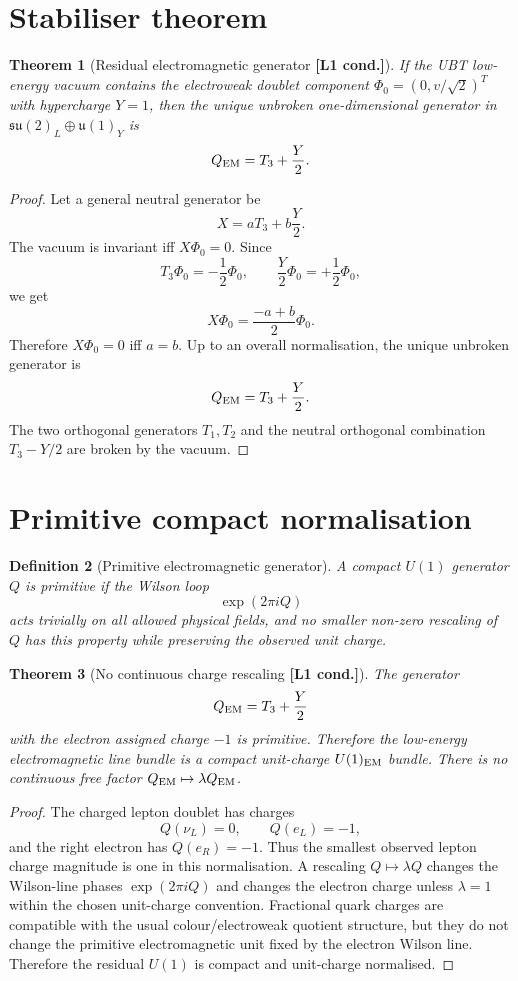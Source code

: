 \documentclass[12pt,a4paper]{article}
\newtheorem{definition}{Definition}[section]
\newtheorem{theorem}[definition]{Theorem}
\newcommand{\Lone}{\textbf{[L1 cond.]}}
\begin{document}
\section{Stabiliser theorem}

\begin{theorem}[Residual electromagnetic generator \Lone]
If the UBT low-energy vacuum contains the electroweak doublet component
\(\Phi_0=(0,v/\sqrt2)^T\) with hypercharge \(Y=1\), then the unique unbroken
one-dimensional generator in \(\mathfrak{su}(2)_L\oplus\mathfrak{u}(1)_Y\) is
\[
  Q_{\rm EM}=T_3+\frac{Y}{2}.
\]
\end{theorem}

\begin{proof}
Let a general neutral generator be
\[
  X=aT_3+b\frac{Y}{2}.
\]
The vacuum is invariant iff \(X\Phi_0=0\).  Since
\[
  T_3\Phi_0=-\frac12\Phi_0,
  \qquad
  \frac{Y}{2}\Phi_0=+\frac12\Phi_0,
\]
we get
\[
  X\Phi_0=\frac{-a+b}{2}\Phi_0.
\]
Therefore \(X\Phi_0=0\) iff \(a=b\).  Up to an overall normalisation, the
unique unbroken generator is
\[
  Q_{\rm EM}=T_3+\frac{Y}{2}.
\]
The two orthogonal generators \(T_1,T_2\) and the neutral orthogonal combination
\(T_3-Y/2\) are broken by the vacuum.
\end{proof}

\section{Primitive compact normalisation}

\begin{definition}[Primitive electromagnetic generator]
A compact \(U(1)\) generator \(Q\) is primitive if the Wilson loop
\[
  \exp(2\pi i Q)
\]
acts trivially on all allowed physical fields, and no smaller non-zero
rescaling of \(Q\) has this property while preserving the observed unit charge.
\end{definition}

\begin{theorem}[No continuous charge rescaling \Lone]
The generator
\[
  Q_{\rm EM}=T_3+\frac{Y}{2}
\]
with the electron assigned charge \(-1\) is primitive.  Therefore the
low-energy electromagnetic line bundle is a compact unit-charge
\(U(1)_{\rm EM}\) bundle.  There is no continuous free factor
\(Q_{\rm EM}\mapsto\lambda Q_{\rm EM}\).
\end{theorem}

\begin{proof}
The charged lepton doublet has charges
\[
  Q(\nu_L)=0,
  \qquad
  Q(e_L)=-1,
\]
and the right electron has \(Q(e_R)=-1\).  Thus the smallest observed lepton
charge magnitude is one in this normalisation.  A rescaling
\(Q\mapsto\lambda Q\) changes the Wilson-line phases
\(\exp(2\pi i Q)\) and changes the electron charge unless \(\lambda=1\) within
the chosen unit-charge convention.  Fractional quark charges are compatible
with the usual colour/electroweak quotient structure, but they do not change
the primitive electromagnetic unit fixed by the electron Wilson line.
Therefore the residual \(U(1)\) is compact and unit-charge normalised.
\end{proof}
\end{document}
